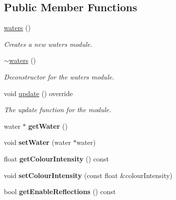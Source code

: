 \subsection*{Public Member Functions}
\begin{DoxyCompactItemize}
\item 
\hyperlink{classflounder_1_1waters_aaa8c51d2a2a197112daee1c483e1cc5f}{waters} ()
\begin{DoxyCompactList}\small\item\em Creates a new waters module. \end{DoxyCompactList}\item 
\hyperlink{classflounder_1_1waters_a75d843a3419deb4f1ee97ac1541b90a0}{$\sim$waters} ()
\begin{DoxyCompactList}\small\item\em Deconstructor for the waters module. \end{DoxyCompactList}\item 
void \hyperlink{classflounder_1_1waters_aaae93cea613594ea9d66819a63d4d85b}{update} () override
\begin{DoxyCompactList}\small\item\em The update function for the module. \end{DoxyCompactList}\item 
\mbox{\label{classflounder_1_1waters_a4263f2dbda54c8bfa668078a8ae545d5}} 
water $\ast$ {\bfseries get\+Water} ()
\item 
\mbox{\label{classflounder_1_1waters_a9d32e99e0d41567f41d078e518081bdc}} 
void {\bfseries set\+Water} (water $\ast$water)
\item 
\mbox{\label{classflounder_1_1waters_a3bec95271cfaa9ffb535b9fa514af9a8}} 
float {\bfseries get\+Colour\+Intensity} () const
\item 
\mbox{\label{classflounder_1_1waters_abf4807c8c81054d90870735e6cb23b23}} 
void {\bfseries set\+Colour\+Intensity} (const float \&colour\+Intensity)
\item 
\mbox{\label{classflounder_1_1waters_a271541cd854a19d433836f07853fe6d3}} 
bool {\bfseries get\+Enable\+Reflections} () const
\item 
\mbox{\label{classflounder_1_1waters_a3c5f8299094f1e00c3c725496a8175f6}} 

\end{DoxyCompactItemize}
